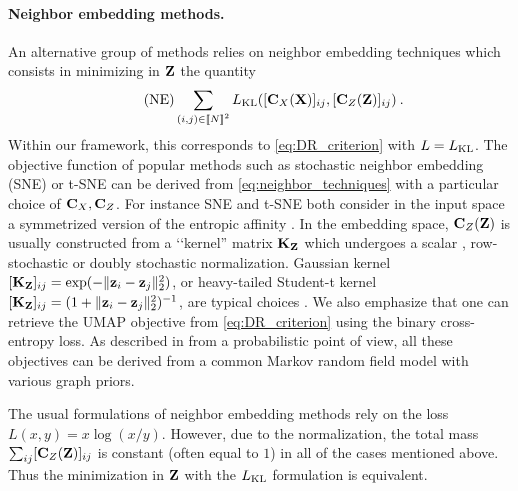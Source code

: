 \paragraph{Neighbor embedding methods.} An alternative group of methods relies on neighbor embedding techniques which consists in minimizing in ${\mathbf{Z}}$ the quantity
\begin{equation}\tag{NE}
	\label{eq:neighbor_techniques}
	\sum_{(i,j) \in {[\![N]\!]}^2} L_{\operatorname{KL}}([{\mathbf{C}}_{X}({\mathbf{X}})]_{ij}, [{\mathbf{C}}_{Z}({\mathbf{Z}})]_{ij}) \:.
\end{equation}
Within our framework, this corresponds to \cref{eq:DR_criterion} with $L = L_{\operatorname{KL}}$. The objective function of popular methods such as stochastic neighbor embedding (SNE) \cite{hinton2002stochastic} or t-SNE \cite{van2008visualizing} can be derived from \cref{eq:neighbor_techniques} with a particular choice of ${\mathbf{C}}_{X}, {\mathbf{C}}_{Z}$. For instance SNE and t-SNE both consider in the input space a symmetrized version of the entropic affinity \cite{vladymyrov2013entropic,van2023snekhorn}. In the embedding space, ${\mathbf{C}}_Z({\mathbf{Z}})$ is usually constructed from a ‘‘kernel'' matrix ${\mathbf{K}}_{\mathbf{Z}}$ which undergoes a scalar \cite{van2008visualizing}, row-stochastic \cite{hinton2002stochastic} or doubly stochastic \cite{lu2019doubly,van2023snekhorn} normalization. Gaussian kernel $[{\mathbf{K}}_{\mathbf{Z}}]_{ij} = \exp(-\|{\mathbf{z}}_i-{\mathbf{z}}_j\|_2^2)$, or heavy-tailed Student-t kernel $[{\mathbf{K}}_{\mathbf{Z}}]_{ij} = (1+\|{\mathbf{z}}_i-{\mathbf{z}}_j\|_2^2)^{-1}$, are typical choices \cite{van2008visualizing}. We also emphasize that one can retrieve the UMAP objective \cite{mcinnes2018umap} from \cref{eq:DR_criterion} using the binary cross-entropy loss. As described in \cite{van2022probabilistic} from a probabilistic point of view, all these objectives can be derived from a common Markov random field model with various graph priors.
\begin{remark}
The usual formulations of neighbor embedding methods rely on the loss $L(x,y) = x \log(x/y)$. However, due to the normalization, the total mass $\sum_{ij} [{\mathbf{C}}_Z({\mathbf{Z}})]_{ij}$ is constant (often equal to $1$) in all of the cases mentioned above. Thus the minimization in ${\mathbf{Z}}$ with the $L_{\operatorname{KL}}$ formulation is equivalent.
\end{remark}

